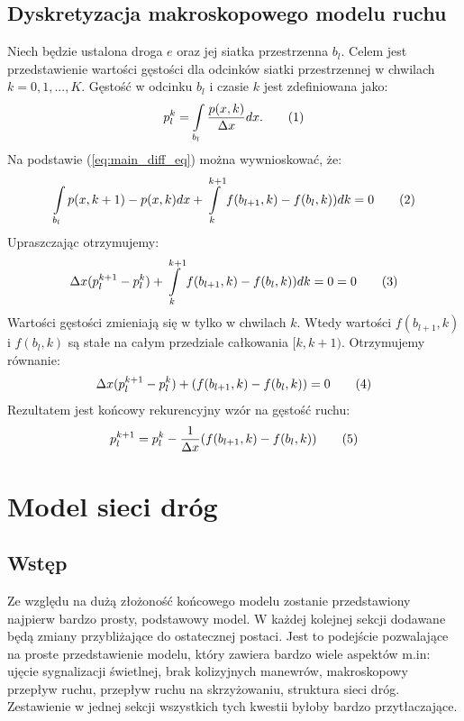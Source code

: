 \documentclass[12pt]{book}
\theoremstyle{plain}
\newcommand\addtag{\refstepcounter{equation}
\renewcommand{\labelenumii}{\theenumii}
\renewcommand{\theenumii}{\theenumi.\arabic{enumii}.}
\tag{\theequation}}
\begin{document}
\section{Dyskretyzacja makroskopowego modelu ruchu}
Niech będzie ustalona droga $e$ oraz jej siatka przestrzenna $b_l$. Celem jest przedstawienie wartości gęstości dla odcinków siatki przestrzennej w chwilach $k=0,1,...,K$.
Gęstość w odcinku $b_l$ i czasie $k$ jest zdefiniowana jako:
\[p_{l}^{k}=\int\limits_{{b_{l}}}{\frac{p(x,k)}{\Delta x}dx}. \addtag\]
Na podstawie (\ref{eq:main_diff_eq}) można wywnioskować, że:
\[\int\limits_{b_{l}} {p(x,k+1)- p(x,k)dx} +\int\limits_{k}^{k+1} f(b_{l+1},k)-f(b_{l},k))dk=0 \addtag \label{eq:calki-LWR} \]
Upraszczając otrzymujemy:
\[\Delta x(p_l^{k+1}-p_l^{k}) +\int\limits_{k}^{k+1} f(b_{l+1},k)-f(b_{l},k))dk=0=0 \addtag \]
Wartości gęstości zmieniają się w tylko w chwilach $k$. Wtedy wartości $f(b_{l+1},k)$ i $f(b_l,k)$ są stałe na całym przedziale całkowania $[k,k+1)$. Otrzymujemy równanie:
\[\Delta x(p_l^{k+1}-p_l^{k})  + (f(b_{l+1},k)-f(b_l,k))=0 \addtag \]
Rezultatem jest końcowy rekurencyjny wzór na gęstość ruchu:
\[p_l^{k+1}=p_l^{k}  -\frac{1}{\Delta x}  (f(b_{l+1},k)-f(b_l,k)) \addtag \]


\chapter{Model sieci dróg}
\section{Wstęp}
Ze względu na dużą złożoność końcowego modelu zostanie przedstawiony najpierw bardzo prosty, podstawowy model. W każdej kolejnej sekcji dodawane będą zmiany przybliżające do ostatecznej postaci. Jest to podejście pozwalające na proste przedstawienie modelu, który zawiera bardzo wiele aspektów m.in:
ujęcie sygnalizacji świetlnej, brak kolizyjnych manewrów, makroskopowy przepływ ruchu, przepływ ruchu na skrzyżowaniu, struktura sieci dróg. Zestawienie w jednej sekcji wszystkich tych kwestii byłoby bardzo przytłaczające.
\end{document}
